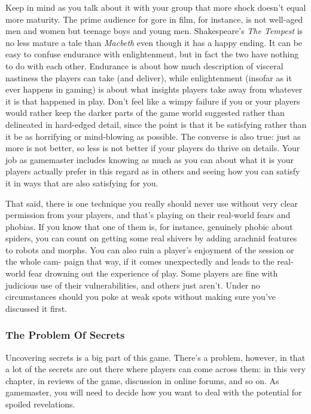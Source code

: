Keep in mind as you talk about it with your group 
that more shock doesn't equal more maturity. The 
prime audience for gore in film, for instance, is not 
well-aged men and women but teenage boys and 
young men. Shakespeare's \textit{The Tempest }is no less 
mature a tale than \textit{Macbeth  }even though it has a 
happy ending. It can be easy to confuse endurance 
with enlightenment, but in fact the two have nothing 
to do with each other. Endurance is about how much 
description of visceral nastiness the players can take 
(and deliver), while enlightenment (insofar as it ever 
happens in gaming) is about what insights players 
take away from whatever it is that happened in play. 
Don't feel like a wimpy failure if you or your players 
would rather keep the darker parts of the game world 
suggested rather than delineated in hard-edged detail, 
since the point is that it be satisfying rather than it 
be as horrifying or mind-blowing as possible. The 
converse is also true: just as more is not better, so less 
is not better if your players do thrive on details. Your 
job as gamemaster includes knowing as much as you 
can about what it is your players actually prefer in 
this regard as in others and seeing how you can satisfy 
it in ways that are also satisfying for you. 

That said, there is one technique you really should 
never use without very clear permission from your 
players, and that's playing on their real-world fears 
and phobias. If you know that one of them is, for 
instance, genuinely phobic about spiders, you can 
count on getting some real shivers by adding arachnid 
features to robots and morphs. You can also ruin a 
player's enjoyment of the session or the whole cam-
paign that way, if it comes unexpectedly and leads 
to the real-world fear drowning out the experience 
of play. Some players are fine with judicious use of 
their vulnerabilities, and others just aren't. Under no 
circumstances should you poke at weak spots without 
making sure you've discussed it first. 

\subsubsection{The Problem Of Secrets }

Uncovering secrets is a big part of this game. There's 
a problem, however, in that a lot of the secrets are out 
there where players can come across them: in this very 
chapter, in reviews of the game, discussion in online 
forums, and so on. As gamemaster, you will need to 
decide how you want to deal with the potential for 
spoiled revelations. 

